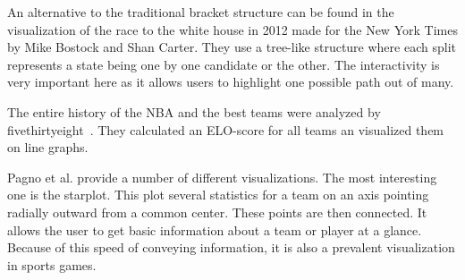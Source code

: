 \documentclass[chi_draft]{sigchi}
\begin{document}
An alternative to the traditional bracket structure can be found in the
visualization of the race to the white house in 2012 made for the New York Times
by Mike Bostock and Shan Carter\cite{whitehousepath}. They use a tree-like
structure where each split represents a state being one by one candidate or the
other. The interactivity is very important here as it allows users to highlight
one possible path out of many.

The entire history of the NBA and the best teams were analyzed by
fivethirtyeight~\cite{fivethirtyeight}. They calculated an ELO-score  for all
teams an visualized them on line graphs. 

Pagno et al. provide a number of different visualizations\cite{starplots}. The
most interesting one is the starplot. This plot several statistics for a team on
an axis pointing radially outward from a common center. These points are then
connected. It allows the user to get basic information about a team or player at
a glance. Because of this speed of conveying information, it is also a prevalent
visualization in sports games.





\end{document}
